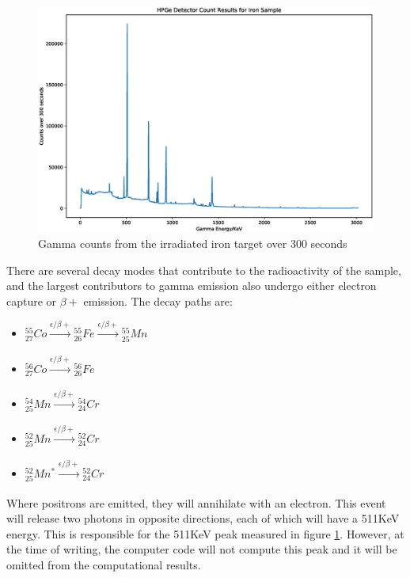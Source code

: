 \begin{figure}[ht] 
  \centering
  \begin{minipage}[b]{0.85\linewidth}
    \centering
    \includegraphics[width=.9\linewidth]{chapters/activity_code/experimental/gamma_counts.eps} 
    \caption{Gamma counts from the irradiated iron target over 300 seconds}  
    \label{fig:measuredgammacounts}
  \end{minipage}%
\end{figure}

There are several decay modes that contribute to the radioactivity of the sample, and the largest contributors to gamma emission also undergo either electron capture or $\beta +$ emission.  The decay paths are:

\begin{itemize}
\item ${}^{55}_{27}Co \xrightarrow[]{\epsilon/\beta +} {}^{55}_{26}Fe \xrightarrow[]{\epsilon/\beta +} {}^{55}_{25}Mn$
\item ${}^{56}_{27}Co \xrightarrow[]{\epsilon/\beta +} {}^{56}_{26}Fe$
\item ${}^{54}_{25}Mn \xrightarrow[]{\epsilon/\beta +} {}^{54}_{24}Cr$
\item ${}^{52}_{25}Mn \xrightarrow[]{\epsilon/\beta +} {}^{52}_{24}Cr$ 
\item ${}^{52}_{25}Mn^{*} \xrightarrow[]{\epsilon/\beta +} {}^{52}_{24}Cr$
\end{itemize}

Where positrons are emitted, they will annihilate with an electron.  This event will release two photons in opposite directions, each of which will have a 511KeV energy.  This is responsible for the 511KeV peak measured in figure \ref{fig:measuredgammacounts}.  However, at the time of writing, the computer code will not compute this peak and it will be omitted from the computational results.



